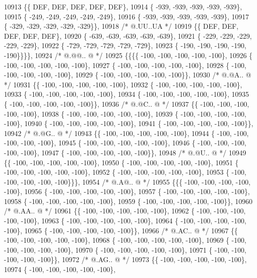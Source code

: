 \begin{DoxyCode}
10913 \{\{  DEF,  DEF,  DEF,  DEF,  DEF\},
10914 \{ -939, -939, -939, -939, -939\},
10915 \{ -249, -249, -249, -249, -249\},
10916 \{ -939, -939, -939, -939, -939\},
10917 \{ -329, -329, -329, -329, -329\}\},
10918 \textcolor{comment}{/*  @.UU..UA */}
10919 \{\{  DEF,  DEF,  DEF,  DEF,  DEF\},
10920 \{ -639, -639, -639, -639, -639\},
10921 \{ -229, -229, -229, -229, -229\},
10922 \{ -729, -729, -729, -729, -729\},
10923 \{ -190, -190, -190, -190, -190\}\}\}\},
10924 \textcolor{comment}{/*  @.@@.. @ */}
10925 \{\{\{\{ -100, -100, -100, -100, -100\},
10926 \{ -100, -100, -100, -100, -100\},
10927 \{ -100, -100, -100, -100, -100\},
10928 \{ -100, -100, -100, -100, -100\},
10929 \{ -100, -100, -100, -100, -100\}\},
10930 \textcolor{comment}{/*  @.@A.. @ */}
10931 \{\{ -100, -100, -100, -100, -100\},
10932 \{ -100, -100, -100, -100, -100\},
10933 \{ -100, -100, -100, -100, -100\},
10934 \{ -100, -100, -100, -100, -100\},
10935 \{ -100, -100, -100, -100, -100\}\},
10936 \textcolor{comment}{/*  @.@C.. @ */}
10937 \{\{ -100, -100, -100, -100, -100\},
10938 \{ -100, -100, -100, -100, -100\},
10939 \{ -100, -100, -100, -100, -100\},
10940 \{ -100, -100, -100, -100, -100\},
10941 \{ -100, -100, -100, -100, -100\}\},
10942 \textcolor{comment}{/*  @.@G.. @ */}
10943 \{\{ -100, -100, -100, -100, -100\},
10944 \{ -100, -100, -100, -100, -100\},
10945 \{ -100, -100, -100, -100, -100\},
10946 \{ -100, -100, -100, -100, -100\},
10947 \{ -100, -100, -100, -100, -100\}\},
10948 \textcolor{comment}{/*  @.@U.. @ */}
10949 \{\{ -100, -100, -100, -100, -100\},
10950 \{ -100, -100, -100, -100, -100\},
10951 \{ -100, -100, -100, -100, -100\},
10952 \{ -100, -100, -100, -100, -100\},
10953 \{ -100, -100, -100, -100, -100\}\}\},
10954 \textcolor{comment}{/*  @.A@.. @ */}
10955 \{\{\{ -100, -100, -100, -100, -100\},
10956 \{ -100, -100, -100, -100, -100\},
10957 \{ -100, -100, -100, -100, -100\},
10958 \{ -100, -100, -100, -100, -100\},
10959 \{ -100, -100, -100, -100, -100\}\},
10960 \textcolor{comment}{/*  @.AA.. @ */}
10961 \{\{ -100, -100, -100, -100, -100\},
10962 \{ -100, -100, -100, -100, -100\},
10963 \{ -100, -100, -100, -100, -100\},
10964 \{ -100, -100, -100, -100, -100\},
10965 \{ -100, -100, -100, -100, -100\}\},
10966 \textcolor{comment}{/*  @.AC.. @ */}
10967 \{\{ -100, -100, -100, -100, -100\},
10968 \{ -100, -100, -100, -100, -100\},
10969 \{ -100, -100, -100, -100, -100\},
10970 \{ -100, -100, -100, -100, -100\},
10971 \{ -100, -100, -100, -100, -100\}\},
10972 \textcolor{comment}{/*  @.AG.. @ */}
10973 \{\{ -100, -100, -100, -100, -100\},
10974 \{ -100, -100, -100, -100, -100\},

\end{DoxyCode}
